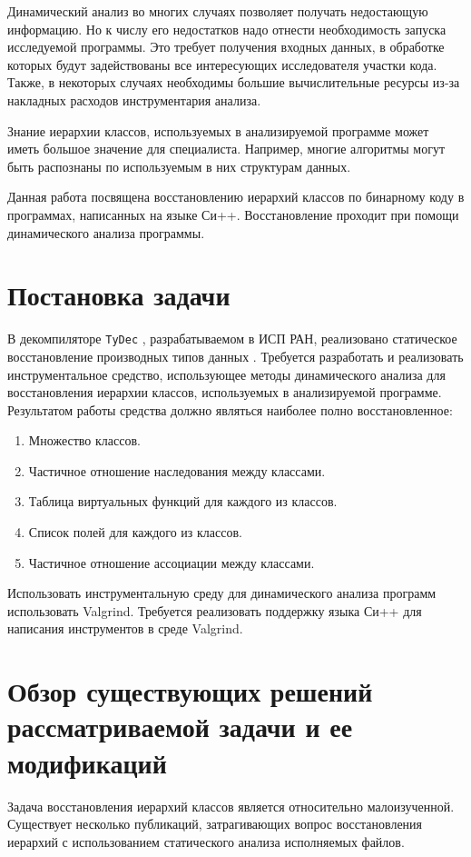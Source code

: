 \documentclass[a4paper,12pt,russian]{article}
\begin{document}
Динамический анализ во многих случаях позволяет получать недостающую информацию. Но к числу его недостатков надо отнести необходимость запуска исследуемой программы.
Это требует получения входных данных, в обработке которых будут задействованы все интересующих исследователя участки кода.
Также, в некоторых случаях необходимы большие вычислительные ресурсы из-за накладных расходов инструментария анализа.

Знание иерархии классов, используемых в анализируемой программе может иметь большое значение для специалиста. Например, многие алгоритмы могут быть распознаны по используемым в них структурам данных.

Данная работа посвящена восстановлению иерархий классов по бинарному коду в программах, написанных на языке Си++.
Восстановление проходит при помощи динамического анализа программы.

\newpage
\section{Постановка задачи}
В декомпиляторе \texttt{TyDec} \cite{tydec}, разрабатываемом в ИСП РАН, реализовано статическое восстановление производных типов данных \cite{typereconstruction}.
Требуется разработать и реализовать инструментальное средство, использующее методы динамического анализа для восстановления иерархии классов, используемых в анализируемой программе.
Результатом работы средства должно являться наиболее полно восстановленное:
\begin{enumerate}
\item Множество классов.
\item Частичное отношение наследования между классами.
\item Таблица виртуальных функций для каждого из классов.
\item Список полей для каждого из классов.
\item Частичное отношение ассоциации между классами.
\end{enumerate}

Использовать инструментальную среду для динамического анализа программ использовать Valgrind.
Требуется реализовать поддержку языка Си++ для написания инструментов в среде Valgrind.

\newpage
\section{Обзор существующих решений рассматриваемой задачи и ее модификаций}
Задача восстановления иерархий классов является относительно малоизученной.
Существует несколько публикаций, затрагивающих вопрос восстановления иерархий с использованием статического анализа исполняемых файлов.
\end{document}
